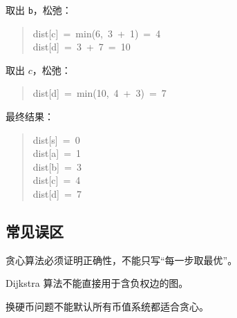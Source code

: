 \documentclass[UTF8,zihao=-4]{ctexart}
\begin{document}
取出 \texttt{b}，松弛：

\begin{quote}
\small\ttfamily\raggedright
\relax dist[c]\ =\ min(6,\ 3\ +\ 1)\ =\ 4\\
\relax dist[d]\ =\ 3\ +\ 7\ =\ 10\\
\end{quote}

取出 $c$，松弛：

\begin{quote}
\small\ttfamily\raggedright
\relax dist[d]\ =\ min(10,\ 4\ +\ 3)\ =\ 7\\
\end{quote}

最终结果：

\begin{quote}
\small\ttfamily\raggedright
\relax dist[s]\ =\ 0\\
\relax dist[a]\ =\ 1\\
\relax dist[b]\ =\ 3\\
\relax dist[c]\ =\ 4\\
\relax dist[d]\ =\ 7\\
\end{quote}

\subsection*{常见误区}

贪心算法必须证明正确性，不能只写“每一步取最优”。

Dijkstra 算法不能直接用于含负权边的图。

换硬币问题不能默认所有币值系统都适合贪心。
\end{document}
